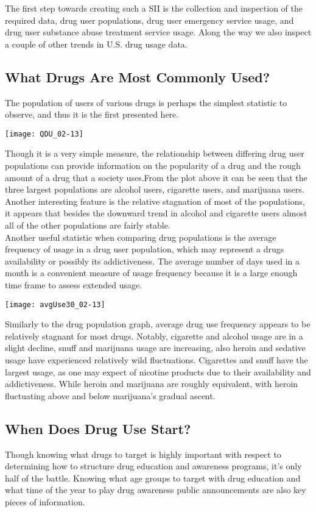\documentclass[a4 paper]{article}
\begin{document}
\noindent The first step towards creating such a SII is the collection and inspection of the required data, drug user populations, drug user emergency service usage, and drug user substance abuse treatment service usage. Along the way we also inspect a couple of other trends in U.S. drug usage data.

\subsection*{What Drugs Are Most Commonly Used?}
The population of users of various drugs is perhaps the simplest statistic to observe, and thus it is the first presented here.

\noindent\texttt{[image: QDU\_02-13]}

\noindent Though it is a very simple measure, the relationship between differing drug user populations can provide information on the popularity of a drug and the rough amount of a drug that a society uses.From the plot above it can be seen that the three largest populations are alcohol users, cigarette users, and marijuana users. Another interesting feature is the relative stagnation of most of the populations, it appears that besides the downward trend in alcohol and cigarette users almost all of the other populations are fairly stable. \\

Another useful statistic when comparing drug populations is the average frequency of usage in a drug user population, which may represent a drugs availability or possibly its addictiveness. The average number of days used in a month is a convenient measure of usage frequency because it is a large enough time frame to assess extended usage.

\noindent\texttt{[image: avgUse30\_02-13]}

\noindent Similarly to the drug population graph, average drug use frequency appears to be relatively stagnant for most drugs. Notably, cigarette and alcohol usage are in a slight decline, snuff and marijuana usage are increasing, also heroin and sedative usage have experienced relatively wild fluctuations. Cigarettes and snuff have the largest usage, as one may expect of nicotine products due to their availability and addictiveness. While heroin and marijuana are roughly equivalent, with heroin fluctuating above and below marijuana's gradual ascent. 

\subsection*{When Does Drug Use Start?}
Though knowing what drugs to target is highly important with respect to determining how to structure drug education and awareness programs, it's only half of the battle. Knowing what age groups to target with drug education and what time of the year to play drug awareness public announcements are also key pieces of information.\\
\end{document}
